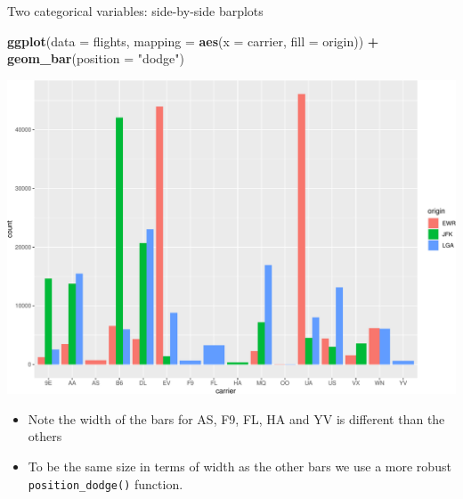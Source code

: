 \documentclass[
  ignorenonframetext,
]{beamer}
\newenvironment{Shaded}{\begin{snugshade}}{\end{snugshade}}
\newcommand{\AttributeTok}[1]{\textcolor[rgb]{0.13,0.29,0.53}{#1}}
\newcommand{\FunctionTok}[1]{\textcolor[rgb]{0.13,0.29,0.53}{\textbf{#1}}}
\newcommand{\NormalTok}[1]{#1}
\newcommand{\SpecialCharTok}[1]{\textcolor[rgb]{0.81,0.36,0.00}{\textbf{#1}}}
\newcommand{\StringTok}[1]{\textcolor[rgb]{0.31,0.60,0.02}{#1}}
\providecommand{\tightlist}{%
  \setlength{\itemsep}{0pt}\setlength{\parskip}{0pt}}
\begin{document}
\begin{frame}[fragile]{Two categorical variables: side-by-side barplots}
\protect\hypertarget{two-categorical-variables-side-by-side-barplots-1}{}
\tiny

\begin{Shaded}
\begin{Highlighting}[]
\FunctionTok{ggplot}\NormalTok{(}\AttributeTok{data =}\NormalTok{ flights, }\AttributeTok{mapping =} \FunctionTok{aes}\NormalTok{(}\AttributeTok{x =}\NormalTok{ carrier, }\AttributeTok{fill =}\NormalTok{ origin)) }\SpecialCharTok{+}
  \FunctionTok{geom\_bar}\NormalTok{(}\AttributeTok{position =} \StringTok{"dodge"}\NormalTok{)}
\end{Highlighting}
\end{Shaded}

\begin{center}\includegraphics[width=0.9\linewidth,height=0.5\textheight]{Week2_files/figure-beamer/unnamed-chunk-44-1} \end{center}
\normalsize

\begin{itemize}
\tightlist
\item
  Note the width of the bars for AS, F9, FL, HA and YV is different than
  the others
\item
  To be the same size in terms of width as the other bars we use a more
  robust \texttt{position\_dodge()} function.
\end{itemize}
\end{frame}
\end{document}
